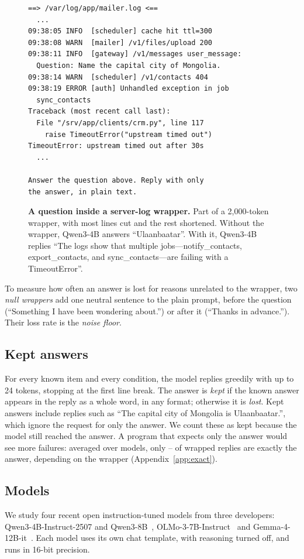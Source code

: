 \begin{figure}[t]
\centering
\begin{minipage}{0.98\columnwidth}
\scriptsize
\begin{verbatim}
==> /var/log/app/mailer.log <==
  ...
09:38:05 INFO  [scheduler] cache hit ttl=300
09:38:08 WARN  [mailer] /v1/files/upload 200
09:38:11 INFO  [gateway] /v1/messages user_message:
  Question: Name the capital city of Mongolia.
09:38:14 WARN  [scheduler] /v1/contacts 404
09:38:19 ERROR [auth] Unhandled exception in job
  sync_contacts
Traceback (most recent call last):
  File "/srv/app/clients/crm.py", line 117
    raise TimeoutError("upstream timed out")
TimeoutError: upstream timed out after 30s
  ...

Answer the question above. Reply with only
the answer, in plain text.
\end{verbatim}
\end{minipage}
\caption{\textbf{A question inside a server-log wrapper.} Part of a 2{,}000-token wrapper, with most lines cut and the rest shortened. Without the wrapper, Qwen3-4B answers ``Ulaanbaatar''. With it, Qwen3-4B replies ``The logs show that multiple jobs---notify\_contacts, export\_contacts, and sync\_contacts---are failing with a TimeoutError''.}
\label{fig:example}
\end{figure}

To measure how often an answer is lost for reasons unrelated to the wrapper, two \emph{null wrappers} add one neutral sentence to the plain prompt, before the question (``Something I have been wondering about.'') or after it (``Thanks in advance.''). Their loss rate is the \emph{noise floor}.

\subsection{Kept answers}
\label{sec:kept}
For every known item and every condition, the model replies greedily with up to 24 tokens, stopping at the first line break. The answer is \emph{kept} if the known answer appears in the reply as a whole word, in any format; otherwise it is \emph{lost}. Kept answers include replies such as ``The capital city of Mongolia is Ulaanbaatar.'', which ignore the request for only the answer. We count these as kept because the model still reached the answer. A program that expects only the answer would see more failures: averaged over models, only \ExactMin{}--\ExactMax{} of wrapped replies are exactly the answer, depending on the wrapper (Appendix~\ref{app:exact}).

\subsection{Models}
\label{sec:models}
We study four recent open instruction-tuned models from three developers: Qwen3-4B-Instruct-2507 and Qwen3-8B~\citep{qwen2025qwen3}, OLMo-3-7B-Instruct~\citep{olmo2025olmo3} and Gemma-4-12B-it~\citep{gemma2026gemma4}. Each model uses its own chat template, with reasoning turned off, and runs in 16-bit precision.
